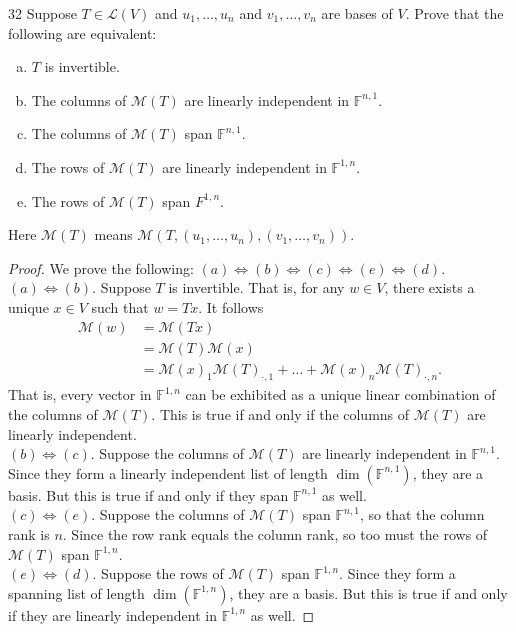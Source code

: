 \documentclass{extarticle}
\newenvironment{problem}[1]{\begin{prob*}{#1}{}}{\end{prob*}}
\newcommand{\F}{\mathbb{F}}
\newcommand{\mat}{\mathcal{M}}
\newcommand{\Hom}{\mathcal{L}}
\begin{document}
\begin{problem}{32}
Suppose $T\in\Hom(V)$ and $u_1,\dots,u_n$ and $v_1,\dots,v_n$ are bases of $V$.  Prove that the following are equivalent:
\begin{enumerate}[(a)]
\item $T$ is invertible.
\item The columns of $\mat(T)$ are linearly independent in $\F^{n,1}$.  
\item The columns of $\mat(T)$ span $\F^{n,1}$.
\item The rows of $\mat(T)$ are linearly independent in $\F^{1,n}$.
\item The rows of $\mat(T)$ span $F^{1,n}$.
\end{enumerate}
Here $\mat(T)$ means $\mat(T,(u_1,\dots,u_n),(v_1,\dots,v_n))$.
\end{problem}
\begin{proof}
We prove the following: $(a)\iff (b) \iff (c)\iff (e)\iff (d)$.\\
\indent $(a)\iff (b)$.  Suppose $T$ is invertible.  That is, for any $w\in V$, there exists a unique $x\in V$ such that $w = Tx$.  It follows
\begin{align*}
\mat(w) &= \mat(Tx)\\
&= \mat(T)\mat(x)\\
&= \mat(x)_1\mat(T)_{\cdot, 1} + \dots + \mat(x)_n\mat(T)_{\cdot, n}.
\end{align*}
That is, every vector in $\F^{1,n}$ can be exhibited as a unique linear combination of the columns of $\mat(T)$.  This is true if and only if the columns of $\mat(T)$ are linearly independent.\\
\indent $(b)\iff (c)$.  Suppose the columns of $\mat(T)$ are linearly independent in $\F^{n,1}$.  Since they form a linearly independent list of length $\dim(\F^{n,1})$, they are a basis.  But this is true if and only if they span $\F^{n,1}$ as well.\\
\indent $(c)\iff (e)$.  Suppose the columns of $\mat(T)$ span $\F^{n,1}$, so that the column rank is $n$.  Since the row rank equals the column rank, so too must the rows of $\mat(T)$ span $\F^{1,n}$.\\
\indent $(e)\iff (d)$.  Suppose the rows of $\mat(T)$ span $\F^{1,n}$.  Since they form a spanning list of length $\dim(\F^{1,n})$, they are a basis. But this is true if and only if they are linearly independent in $\F^{1,n}$ as well.
\end{proof}
\end{document}
